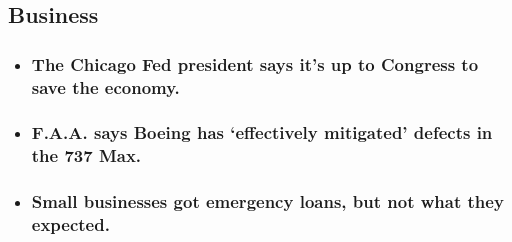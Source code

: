 \begin{itemize}
  \hypertarget{business}{%
  \subsection{Business}\label{business}}

  \begin{itemize}
  \item
    \href{https://www.nytimes.com/live/2020/08/03/business/stock-market-today-coronavirus?type=styln-live-updates\&label=business\&index=1\#the-chicago-fed-president-says-its-up-to-congress-to-save-the-economy}{}

    \hypertarget{the-chicago-fed-president-says-its-up-to-congress-to-save-the-economy}{%
    \subsubsection{The Chicago Fed president says it's up to Congress to
    save the
    economy.}\label{the-chicago-fed-president-says-its-up-to-congress-to-save-the-economy}}
  \item
    \href{https://www.nytimes.com/live/2020/08/03/business/stock-market-today-coronavirus?type=styln-live-updates\&label=business\&index=1\#faa-says-boeing-has-effectively-mitigated-defects-in-the-737-max}{}

    \hypertarget{faa-says-boeing-has-effectively-mitigated-defects-in-the-737-max}{%
    \subsubsection{F.A.A. says Boeing has `effectively mitigated'
    defects in the 737
    Max.}\label{faa-says-boeing-has-effectively-mitigated-defects-in-the-737-max}}
  \item
    \href{https://www.nytimes.com/live/2020/08/03/business/stock-market-today-coronavirus?type=styln-live-updates\&label=business\&index=1\#small-businesses-got-emergency-loans-but-not-what-they-expected}{}

    \hypertarget{small-businesses-got-emergency-loans-but-not-what-they-expected}{%
    \subsubsection{Small businesses got emergency loans, but not what
    they
    expected.}\label{small-businesses-got-emergency-loans-but-not-what-they-expected}}
  \end{itemize}
\end{itemize}

